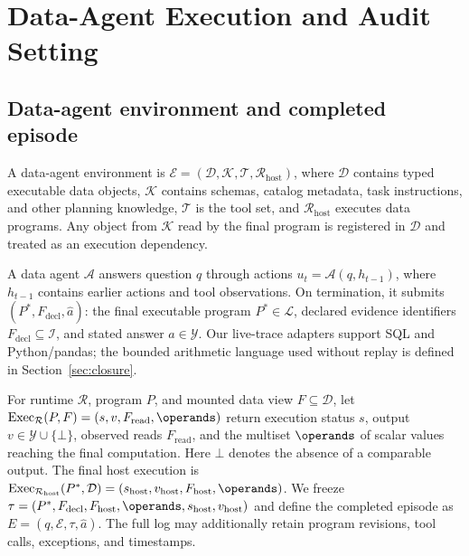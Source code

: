 \section{Data-Agent Execution and Audit Setting}
\label{sec:problem}

\subsection{Data-agent environment and completed episode}
\label{sec:episode}

A data-agent environment is
$\mathcal E=(\mathcal D,\mathcal K,\mathcal T,
\mathcal R_{\mathrm{host}})$, where $\mathcal D$ contains typed
executable data objects, $\mathcal K$ contains schemas, catalog metadata,
task instructions, and other planning knowledge, $\mathcal T$ is the tool
set, and $\mathcal R_{\mathrm{host}}$ executes data programs. Any object
from $\mathcal K$ read by the final program is registered in $\mathcal D$
and treated as an execution dependency.

A data agent $\mathcal A$ answers question $q$ through actions
$u_t=\mathcal A(q,h_{t-1})$, where $h_{t-1}$ contains earlier actions and
tool observations. On termination, it submits
$(P^*,F_{\mathrm{decl}},\hat a)$: the final executable program
$P^*\in\mathcal L$, declared evidence identifiers
$F_{\mathrm{decl}}\subseteq\mathcal I$, and stated answer
$\hat a\in\mathcal Y$. Our live-trace adapters support SQL and
Python/pandas; the bounded arithmetic language used without replay is
defined in Section~\ref{sec:closure}.

For runtime $\mathcal R$, program $P$, and mounted data view
$F\subseteq\mathcal D$, let
$\operatorname{Exec}_{\mathcal R}(P,F)
=(s,v,F_{\mathrm{read}},\operands)$ return execution status $s$, output
$v\in\mathcal Y\cup\{\bot\}$, observed reads $F_{\mathrm{read}}$, and the
multiset $\operands$ of scalar values reaching the final computation.
Here $\bot$ denotes the absence of a comparable output. The final host
execution is
$\operatorname{Exec}_{\mathcal R_{\mathrm{host}}}(P^*,\mathcal D)
=(s_{\mathrm{host}},v_{\mathrm{host}},F_{\mathrm{host}},\operands)$.
We freeze
$\tau=(P^*,F_{\mathrm{decl}},F_{\mathrm{host}},\operands,
 s_{\mathrm{host}},v_{\mathrm{host}})$ and define the completed episode as
$E=(q,\mathcal E,\tau,\hat a)$. The full log may additionally retain
program revisions, tool calls, exceptions, and timestamps.

